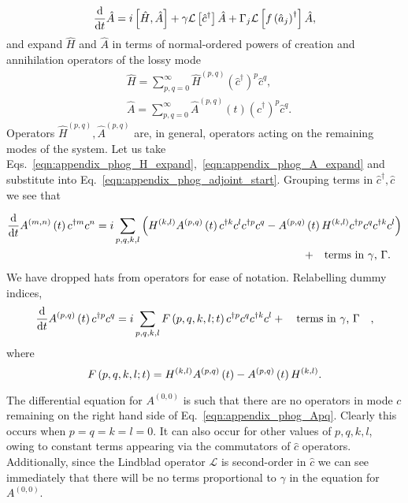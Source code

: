 \begin{equation}\label{eqn:appendix_phog_adjoint_start}
\frac{\mathrm{d}}{\mathrm{d}t} \hat{A} = i \left[ \hat{H}, \hat{A} \right] + \gamma \mathcal{L}\left[\hat{c}^\dagger \right] \hat{A} + \Gamma_j \mathcal{L} \left[ f\left(\hat{a}_j\right)^\dagger\right] \hat{A},
\end{equation}
and expand $\hat{H}$ and $\hat{A}$ in terms of normal-ordered powers of creation and annihilation operators of the lossy mode
\begin{align}
&\hat{H} = \sum_{p, q = 0}^{\infty} \hat{H}^{\left(p, q\right)} \left(\hat{c}^\dagger\right)^p \hat{c}^q, \label{eqn:appendix_phog_H_expand}  \\
%
&\hat{A} = \sum_{p, q = 0}^{\infty} \hat{A}^{\left(p, q\right)}\left(t\right) \left(\hat{c}^\dagger \right)^p \hat{c}^q . \label{eqn:appendix_phog_A_expand}
\end{align}
Operators $\hat{H}^{\left(p, q\right)}, \hat{A}^{\left(p, q\right)}$ are, in general, operators acting on the remaining modes of the system. Let us take Eqs.~\ref{eqn:appendix_phog_H_expand},~\ref{eqn:appendix_phog_A_expand} and substitute into Eq.~\ref{eqn:appendix_phog_adjoint_start}. Grouping terms in $\hat{c}^\dagger, \hat{c}$ we see that 

\begin{align}
\ddt A^{\left(m, n\right)}\left(t\right) c^{\dagger m} c^n = i \sum_{p, q, k, l} \left(H^{\left(k, l\right)} A^{\left(p, q\right)}\left(t\right) c^{\dagger k} c^{l} c^{\dagger p} c^q - A^{\left(p, q\right)}\left(t\right) H^{\left(k, l\right)} c^{\dagger p} c^q c^{\dagger k} c^l\right)& \notag \\
%
+ \qq{terms in $\gamma$, $\Gamma$.}&
\end{align}
We have dropped hats from operators for ease of notation. Relabelling dummy indices,
\begin{equation}\label{eqn:appendix_phog_Apq}
\ddt A^{\left(p, q\right)}\left(t\right) c^{\dagger p} c^q = i \sum_{p, q, k, l} F\left(p, q, k, l; t\right) c^{\dagger p} c^{q} c^{\dagger k} c^l + \qq{terms in $\gamma$, $\Gamma$},
\end{equation}
where
\begin{equation}
F\left(p, q, k, l; t\right) = H^{\left(k, l\right)} A^{\left(p, q\right)}\left(t\right) - A^{\left(p, q\right)}\left(t\right) H^{\left(k, l\right)}. \notag
\end{equation}

\noindent The differential equation for $A^{\left(0, 0\right)}$ is such that there are no operators in mode $c$ remaining on the right hand side of Eq.~\ref{eqn:appendix_phog_Apq}. Clearly this occurs when $p=q=k=l=0$. It can also occur for other values of $p, q, k, l$, owing to constant terms appearing via the commutators of $\hat{c}$ operators. Additionally, since the Lindblad operator $\mathcal{L}$ is second-order in $\hat{c}$ we can see immediately that there will be no terms proportional to $\gamma$ in the equation for $A^{\left(0, 0\right)}$. 

